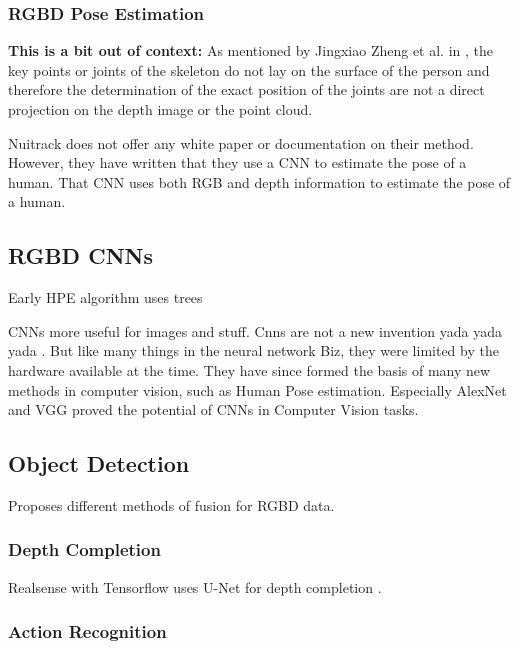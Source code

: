 \subsubsection{RGBD Pose Estimation}

\textbf{This is a bit out of context:}
As mentioned by Jingxiao Zheng et al. in \cite{MultiModalHPERGBD}, the key points or joints of the skeleton do not lay on the surface of the person and therefore the determination of the exact position of the joints are not a direct projection on the depth image or the point cloud.

\cite{PASCUALHERNANDEZ2022102225}

\cite{RGBDHPEforRoboticTaskLearning}

Nuitrack does not offer any white paper or documentation on their method. However, they have written that they use a CNN to estimate the pose of a human. That CNN uses both RGB and depth information to estimate the pose of a human.


\subsection{RGBD CNNs}

Early HPE algorithm uses trees \cite{EarlyRGBDHPE}

CNNs more useful for images and stuff. Cnns are not a new invention yada yada yada \cite{OldCNN}. But like many things in the neural network Biz, they were limited by the hardware available at the time. They have since formed the basis of many new methods in computer vision, such as Human Pose estimation. Especially AlexNet \cite{AlexNet} and VGG \cite{VGG} proved the potential of CNNs in Computer Vision tasks. 

\subsection{Object Detection}

\cite{Chen2021} Proposes different methods of fusion for RGBD data.

\subsubsection{Depth Completion}

Realsense with Tensorflow \cite{TensorflowRealsense} uses U-Net for depth completion \cite{UNET}.

\subsubsection{Action Recognition}

